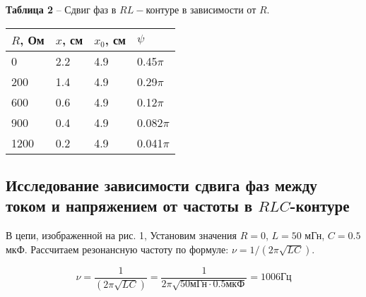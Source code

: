\documentclass[12pt,a4paper]{article}
\begin{document}
        \begin{table}[!h]
        \begin{flushleft}
       		\hspace{80}\textbf{Таблица 2} -- Сдвиг фаз в $RL-$контуре в зависимости от  $R$.\\
        \end{flushleft}
            \begin{center}
                \begin{tabular}{ | l | l | l | l |}
                    \hline
                    $R$, Ом &   $x$, см &  $x_0$, см&   $\psi$      \\
                    \hline
                    0       &   2.2     &   4.9     &   0.45$\pi$   \\
                    200     &   1.4     &   4.9     &   0.29$\pi$   \\
                    600     &   0.6     &   4.9     &   0.12$\pi$   \\
                    900     &   0.4     &   4.9     &   0.082$\pi$  \\
                    1200    &   0.2     &   4.9     &   0.041$\pi$  \\
                    \hline                
                \end{tabular}
            \end{center}
        \end{table}
        
    \subsection{Исследование зависимости сдвига фаз между током и напряжением от частоты в $RLC$-контуре}
        В цепи, изображенной на рис. 1, Установим значения $R = 0$, $L = 50$ мГн, $C = 0.5$ мкФ. Рассчитаем резонансную частоту по формуле: $\nu = 1/(2 \pi \sqrt{LC})$.
        
        \[
        \nu = \frac{1}{(2 \pi \sqrt{LC})} = \frac{1}{2 \pi \sqrt{50\text{мГн} \cdot 0.5 \text{мкФ}}} = 1006 \text{Гц}
        \]
        
\end{document}

